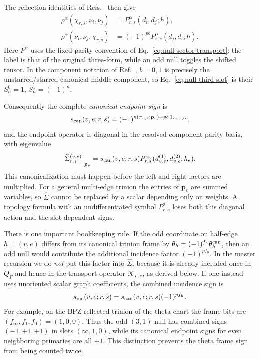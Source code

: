\documentclass[11pt]{article}
\begin{document}
The reflection identities of
Refs.~\cite{HadaszJaskolskiSuchanek2007NSBlocks,BelavinGeiko2018CRecursion}
then give
\begin{align}
 \rho^\alpha(\chi_{r,s},\nu_i,\nu_j)
&=P_{r,s}^{\alpha}(d_i,d_j;h),
 \label{eq:null-first-slot}\\
 \rho^\alpha(\nu_i,\nu_j,\chi_{r,s})
&=(-1)^{p b}P_{r,s}^{\alpha}(d_j,d_i;h).
 \label{eq:null-third-slot}
\end{align}
Here \(P^\alpha\) uses the fixed-parity convention of
Eq.~\eqref{eq:null-sector-transport}: the label is that of the original
three-form, while an odd null toggles the shifted tensor.  In the component
notation of Ref.~\cite{BelavinGeiko2018CRecursion}, \(b=0,1\) is precisely
the unstarred/starred canonical middle component, so
Eq.~\eqref{eq:null-third-slot} is their
\(S^0_n=1\), \(S^1_n=(-1)^n\).

Consequently the complete \emph{canonical endpoint sign} is
\begin{equation}
 s_{\rm can}(v,e;r,s)
 =(-1)^{\kappa(\pi_{v,e};\bm p_v)
          +p b\,\mathbf 1_{\{a=3\}}},
 \label{eq:canonical-endpoint-sign}
\end{equation}
and the endpoint operator is diagonal in the resolved component-parity basis,
with eigenvalue
\begin{equation}
 \left.\widehat\Sigma_{r,s}^{(v,e)}\right|_{\bm p_v}
 =s_{\rm can}(v,e;r,s)
   P_{r,s}^{\alpha_v}(d_{v,e}^{(1)},d_{v,e}^{(2)};h_e).
 \label{eq:sigma-vertex}
\end{equation}
This canonicalization must happen before the left and right factors are
multiplied.  For a general multi-edge trinion the entries of \(\bm p_v\) are
summed variables, so \(\widehat\Sigma\) cannot be replaced by a scalar
depending only on weights.  A topology formula with an undifferentiated symbol
\(P_{r,s}^2\) loses both this diagonal action and the slot-dependent signs.

There is one important bookkeeping rule.  If the odd coordinate on half-edge
\(h=(v,e)\) differs from its canonical trinion frame by
\(\theta_h=(-1)^{f_h}\theta_h^{\rm can}\), then an odd null would contribute
the additional incidence factor \((-1)^{p f_h}\).  In the master recursion
we do \emph{not} put this factor into \(\widehat\Sigma\), because it is already
included once in \(Q_\Gamma\) and hence in the transport operator
\(\mathcal K_{\Gamma,e}\), as derived below.  If one instead uses unoriented
scalar graph coefficients, the combined incidence sign is
\begin{equation}
 s_{\rm inc}(v,e;r,s)=s_{\rm can}(v,e;r,s)(-1)^{p f_h}.
 \label{eq:combined-incidence-sign}
\end{equation}
For example, on the BPZ-reflected trinion of the theta chart the frame bits
are \((f_\infty,f_1,f_0)=(1,0,0)\).  Thus the odd \((3,1)\) null has combined
signs \((-1,+1,+1)\) in slots \((\infty,1,0)\), while its canonical endpoint
signs for even neighboring primaries are all \(+1\).  This distinction
prevents the theta frame sign from being counted twice.
\end{document}
